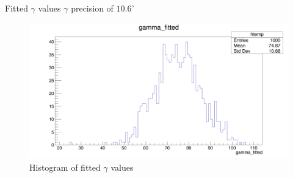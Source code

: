 \documentclass{beamer}
\begin{document}
\begin{frame}{Fitted $\gamma$ values}
  $\gamma$ precision of $10.6^\circ$
  \begin{figure}
    \centering
    \includegraphics[width = 1.0\textwidth]{UnbinnedPulls/gammafitted1K1K.png}
    \caption{Histogram of fitted $\gamma$ values}
  \end{figure}
\end{frame}
\end{document}
